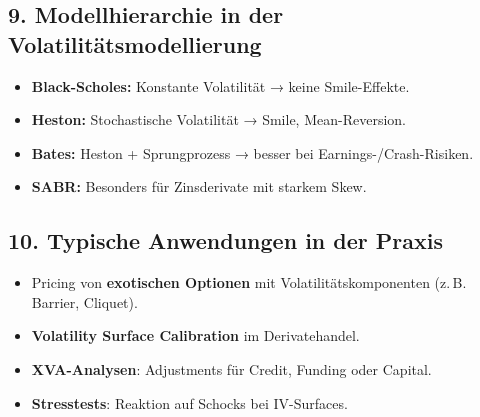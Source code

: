 \documentclass[a4paper,12pt]{article}
\begin{document}
\subsection*{9. Modellhierarchie in der Volatilitätsmodellierung}
\begin{tcolorbox}[title=Vergleich der Modelle]
\begin{itemize}
  \item \textbf{Black-Scholes:} Konstante Volatilität → keine Smile-Effekte.
  \item \textbf{Heston:} Stochastische Volatilität → Smile, Mean-Reversion.
  \item \textbf{Bates:} Heston + Sprungprozess → besser bei Earnings-/Crash-Risiken.
  \item \textbf{SABR:} Besonders für Zinsderivate mit starkem Skew.
\end{itemize}
\end{tcolorbox}

\subsection*{10. Typische Anwendungen in der Praxis}
\begin{tcolorbox}[title=Einsatzbereiche des Heston-Modells]
\begin{itemize}
  \item Pricing von \textbf{exotischen Optionen} mit Volatilitätskomponenten (z.\,B. Barrier, Cliquet).
  \item \textbf{Volatility Surface Calibration} im Derivatehandel.
  \item \textbf{XVA-Analysen}: Adjustments für Credit, Funding oder Capital.
  \item \textbf{Stresstests}: Reaktion auf Schocks bei IV-Surfaces.
\end{itemize}
\end{tcolorbox}
\end{document}
